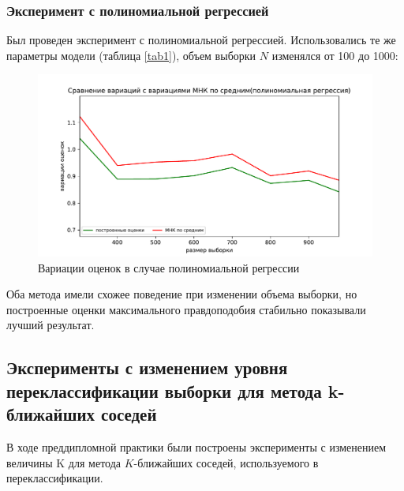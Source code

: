 \subsubsection{Эксперимент с полиномиальной регрессией}
Был проведен эксперимент с полиномиальной регрессией. Использовались те же параметры модели (таблица \ref{tab1}), объем выборки $N$ изменялся от 100 до 1000:
\begin{figure}[h!]
    \centering
    \includegraphics[width=150mm]{../images/polynomial.pdf}
    \caption{Вариации оценок в случае полиномиальной регрессии\label{overflow}}
    \label{pic3}
\end{figure}

Оба метода имели схожее поведение при изменении объема выборки, но построенные оценки максимального правдоподобия стабильно показывали лучший результат.

\subsection{Эксперименты с изменением уровня переклассификации выборки для метода k-ближайших соседей}\label{ss3_3_1}
В ходе преддипломной практики были построены эксперименты с изменением величины K для метода $K$-ближайших соседей, используемого в переклассификации.  

